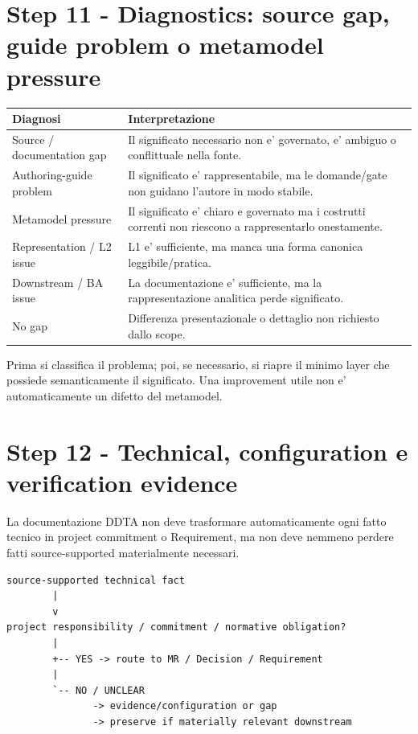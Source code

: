 \documentclass[11pt,a4paper]{article}
\begin{document}
\section{Step 11 - Diagnostics: source gap, guide problem o metamodel pressure}
\holdouttag

\begin{tabularx}{\textwidth}{L{45mm}Y}
\toprule
\textbf{Diagnosi} & \textbf{Interpretazione} \\
\midrule
Source / documentation gap & Il significato necessario non e' governato, e' ambiguo o conflittuale nella fonte. \\
Authoring-guide problem & Il significato e' rappresentabile, ma le domande/gate non guidano l'autore in modo stabile. \\
Metamodel pressure & Il significato e' chiaro e governato ma i costrutti correnti non riescono a rappresentarlo onestamente. \\
Representation / L2 issue & L1 e' sufficiente, ma manca una forma canonica leggibile/pratica. \\
Downstream / BA issue & La documentazione e' sufficiente, ma la rappresentazione analitica perde significato. \\
No gap & Differenza presentazionale o dettaglio non richiesto dallo scope. \\
\bottomrule
\end{tabularx}

\begin{ddtacore}[title={Minimum owning layer}]
Prima si classifica il problema; poi, se necessario, si riapre il minimo layer che possiede semanticamente il significato. Una improvement utile non e' automaticamente un difetto del metamodel.
\end{ddtacore}

\section{Step 12 - Technical, configuration e verification evidence}
\holdouttag

La documentazione DDTA non deve trasformare automaticamente ogni fatto tecnico in project commitment o Requirement, ma non deve nemmeno perdere fatti source-supported materialmente necessari.

\begin{lstlisting}
source-supported technical fact
        |
        v
project responsibility / commitment / normative obligation?
        |
        +-- YES -> route to MR / Decision / Requirement
        |
        `-- NO / UNCLEAR
               -> evidence/configuration or gap
               -> preserve if materially relevant downstream
\end{lstlisting}
\end{document}
